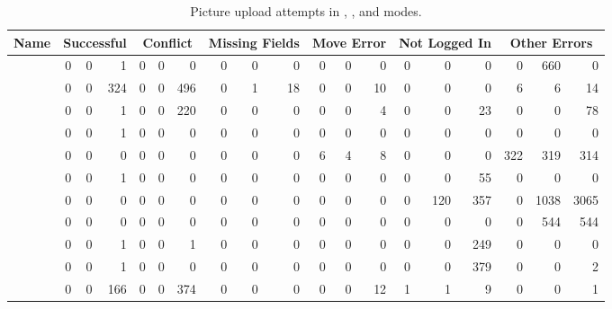   \begin{table*}[htbp]
    \centering
    {\scriptsize
      \begin{tabular}{|l|rrr|rrr|rrr|rrr|rrr|rrr|}
        \hline
        Name & \multicolumn{3}{|c|}{Successful} & \multicolumn{3}{|c|}{Conflict} & \multicolumn{3}{|c|}{Missing Fields} & \multicolumn{3}{|c|}{Move Error} & \multicolumn{3}{|c|}{Not Logged In} & \multicolumn{3}{|c|}{Other Errors} \\
        \hline
        \acunetix{} & 0&0&1   & 0&0&0   & 0&0&0   & 0&0&0   & 0&0&0   & 0&660&0 \\
        \appscan{} & 0&0&324   & 0&0&496   & 0&1&18   & 0&0&10   & 0&0&0   & 6&6&14 \\
        \burp{} & 0&0&1   & 0&0&220   & 0&0&0   & 0&0&4   & 0&0&23   & 0&0&78 \\
        \grendelscan{} & 0&0&1   & 0&0&0   & 0&0&0   & 0&0&0   & 0&0&0   & 0&0&0 \\
        \hailstorm{} & 0&0&0   & 0&0&0   & 0&0&0   & 6&4&8   & 0&0&0   & 322&319&314 \\
        \milescan{} & 0&0&1   & 0&0&0   & 0&0&0   & 0&0&0   & 0&0&55  & 0&0&0 \\
        \nstalker{} & 0&0&0   & 0&0&0   & 0&0&0   & 0&0&0   & 0&120&357   & 0&1038&3065 \\
        \ntospider{} & 0&0&0   & 0&0&0   & 0&0&0   & 0&0&0   & 0&0&0   & 0&544&544 \\
        \paros{} & 0&0&1   & 0&0&1   & 0&0&0   & 0&0&0   & 0&0&249   & 0&0&0 \\
        \waf{} & 0&0&1   & 0&0&0   & 0&0&0   & 0&0&0   & 0&0&379   & 0&0&2 \\
        \webinspect{} & 0&0&166   & 0&0&374   & 0&0&0   & 0&0&12   & 1&1&9   & 0&0&1 \\
        \hline
      \end{tabular}}
    \caption{Picture upload attempts in \initial, \config, and \manual{} modes.}
    \label{create-pictures}
  \end{table*}
